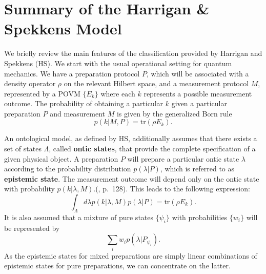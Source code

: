 \documentclass[twocolumn,prl,floatfix,superscriptaddress]{revtex4-2}
\begin{document}
\section{Summary of the Harrigan \& Spekkens Model}

We briefly review the main features of the classification provided by Harrigan and Spekkens (HS)\cite{Harrigan:2010}. We start with the usual operational setting for quantum mechanics. We have a preparation protocol $P$, which will be associated with a density operator $\rho$ on the relevant Hilbert space, and a measurement protocol $M$, represented by a POVM $\{ E_k\}$ where each $k$ represents a possible measurement outcome. The probability of obtaining a particular $k$ given a particular preparation $P$ and measurement $M$ is given by the generalized Born rule
\begin{equation}
	p(k|M, P)=\textrm{tr}(\rho E_k).
\end{equation}

An ontological model, as defined by HS, additionally assumes that there exists a set of states $\Lambda$, called \textbf{ontic states}, that provide the complete specification of a given physical object. A preparation $P$ will prepare a particular ontic state $\lambda$ according to the probability distribution $p(\lambda | P)$, which is referred to as \textbf{epistemic state}. The measurement outcome will depend only on the ontic state with probability $p(k|\lambda, M)$.(\cite{Harrigan:2010}, p.\ 128). This leads to the following expression:
\begin{equation}
	\int_\Lambda d\lambda p(k|\lambda, M) p(\lambda| P)= \textrm{tr}(\rho E_k).
\end{equation}
It is also assumed that a mixture of pure states $\{ \psi_i \}$ with probabilities $\{ w_i \}$ will be represented by
\begin{equation}\label{epistemic_mixing}
	\sum_i  w_i p(\lambda| P_{\psi_i}).
\end{equation}
As the epistemic states for mixed preparations are simply linear combinations of epistemic states for pure preparations, we can concentrate on the latter.
\end{document}
